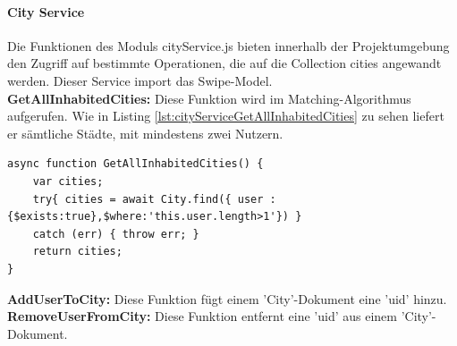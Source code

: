%
%
\paragraph{City Service}
Die Funktionen des Moduls cityService.js bieten innerhalb der Projektumgebung den Zugriff auf bestimmte Operationen, die auf die Collection cities angewandt werden. Dieser Service import das Swipe-Model.\\

\noindent
\textbf{GetAllInhabitedCities:}
Diese Funktion wird im Matching-Algorithmus aufgerufen. Wie in Listing \ref{lst:cityServiceGetAllInhabitedCities} zu sehen liefert er sämtliche Städte, mit mindestens zwei Nutzern. 

\begin{lstlisting}[caption=City Service - GetAllInhabitedCities, label=lst:cityServiceGetAllInhabitedCities]
async function GetAllInhabitedCities() {
    var cities;
    try{ cities = await City.find({ user : {$exists:true},$where:'this.user.length>1'}) }
    catch (err) { throw err; }
    return cities;
}
\end{lstlisting}

\noindent
\textbf{AddUserToCity:}
Diese Funktion fügt einem 'City'-Dokument eine 'uid' hinzu.\\

\noindent
\textbf{RemoveUserFromCity:}
Diese Funktion entfernt eine 'uid' aus einem 'City'-Dokument.

